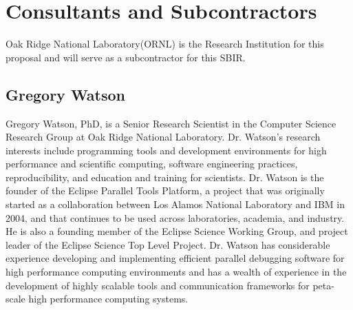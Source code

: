 \section{Consultants and Subcontractors}
Oak Ridge National Laboratory(ORNL) is the Research Institution for this proposal and will serve as a subcontractor for this SBIR. 
\subsection{Gregory Watson}
Gregory Watson, PhD, is a Senior Research Scientist in the Computer Science Research Group at Oak Ridge National Laboratory. Dr. Watson's research interests include programming tools and development environments for high performance and scientific computing, software engineering practices, reproducibility, and education and training for scientists. Dr. Watson is the founder of the Eclipse Parallel Tools Platform, a project that was originally started as a collaboration between Los Alamos National Laboratory and IBM in 2004, and that continues to be used across laboratories, academia, and industry. He is also a founding member of the Eclipse Science Working Group, and project leader of the Eclipse Science Top Level Project. Dr. Watson has considerable experience developing and implementing efficient parallel debugging software for high performance computing environments and has a wealth of experience in the development of highly scalable tools and communication frameworks for peta-scale high performance computing systems.

